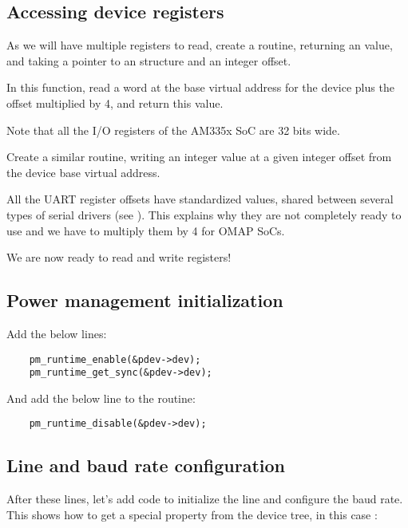 \subsection{Accessing device registers}

As we will have multiple registers to read, create a 
routine, returning an  value, and  taking a 
pointer to an  structure and an  integer
offset.

In this function, read a word at the base virtual address
for the device plus the offset multiplied by 4, and return this value.

Note that all the I/O registers of the AM335x SoC are 32 bits wide.

Create a similar  routine, writing an integer value
at a given integer offset from the device base virtual address.

All the UART register offsets have standardized values, shared between
several types of serial drivers (see
). This explains why they are not
completely ready to use and we have to multiply them by 4 for OMAP SoCs.

We are now ready to read and write registers!

\subsection{Power management initialization}

Add the below lines:

\begin{verbatim}
	pm_runtime_enable(&pdev->dev);
	pm_runtime_get_sync(&pdev->dev);
\end{verbatim}

And add the below line to the  routine:

\begin{verbatim}
	pm_runtime_disable(&pdev->dev);
\end{verbatim}

\subsection{Line and baud rate configuration}

After these lines, let's add code to initialize the line
and configure the baud rate. This shows how to get a special
property from the device tree, in this case :

